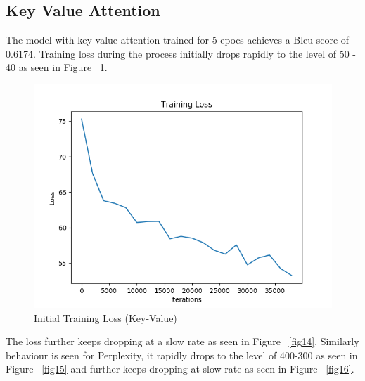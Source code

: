\documentclass[11pt,a4paper]{article}
\begin{document}


\subsection{Key Value Attention}

The model with key value attention trained for 5 epocs achieves a Bleu score of 0.6174.
Training loss during the process initially drops rapidly to the level of 50 - 40 as seen in Figure ~\ref{fig13}. 

\begin{figure}[!htbp]
\includegraphics[width=\linewidth]{hi_key-value_loss_1.png}
\caption{Initial Training Loss (Key-Value)}
\label{fig13}
\end{figure}


The loss further keeps dropping at a slow rate as seen in Figure ~\ref{fig14}. Similarly behaviour is seen for Perplexity, it rapidly drops to the level of 400-300 as seen in Figure ~\ref{fig15} and further keeps dropping at slow rate as seen in Figure ~\ref{fig16}.

\end{document}

